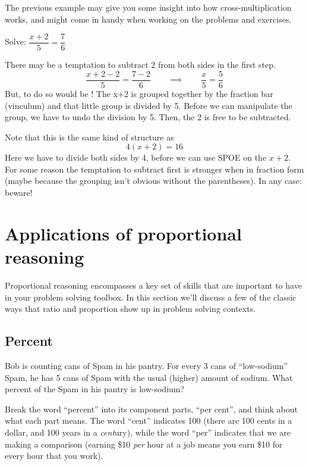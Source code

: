 The previous example may give you some insight into how cross-multiplication works, and might come in handy when working on the problems and exercises.

\begin{boxwarn}
Solve: $\dfrac{x+2}{5} = \dfrac{7}{6}$

There may be a temptation to subtract 2 from both sides in the first step. \[\dfrac{x+2-2}{5} = \frac{7-2}{6} \qquad\implies\qquad \dfrac{x}{5} = \frac{5}{6}\]
But, to do so would be \evilandwrong! The x+2 is grouped together by the fraction bar (vinculum) and that little group is divided by 5. Before we can manipulate the group, we have to undo the division by 5. Then, the 2 is free to be subtracted.

Note that this is the same kind of structure as \[ 4(x+2) = 16\] Here we have to divide both sides by 4, before we can use SPOE on the $x+2$. For some reason the temptation to subtract first is stronger when in fraction form (maybe because the grouping isn't obvious without the parentheses). In any case: beware!
\end{boxwarn}

\section{Applications of proportional reasoning}
\label{sec:probsolvwithprops}

Proportional reasoning encompasses a key set of skills that are important to have in your problem solving toolbox. In this section we'll discuss a few of the classic ways that ratio and proportion show up in problem solving contexts.

\subsection{Percent}


\begin{boxexplore}
Bob is counting cans of Spam in his pantry. For every 3 cans of ``low-sodium'' Spam, he has 5 cans of Spam with the usual (higher) amount of sodium. What percent of the Spam in his pantry is low-sodium? 
\end{boxexplore}

Break the word ``percent'' into its component parts, ``per cent'', and think about what each part means. The word ``cent'' indicates 100 (there are 100 {\em} cents in a dollar, and 100 years in a \textit{cent}ury), while the word ``per'' indicates that we are making a comparison (earning \$10 \textit{per} hour at a job means you earn \$10 for every hour that you work).

